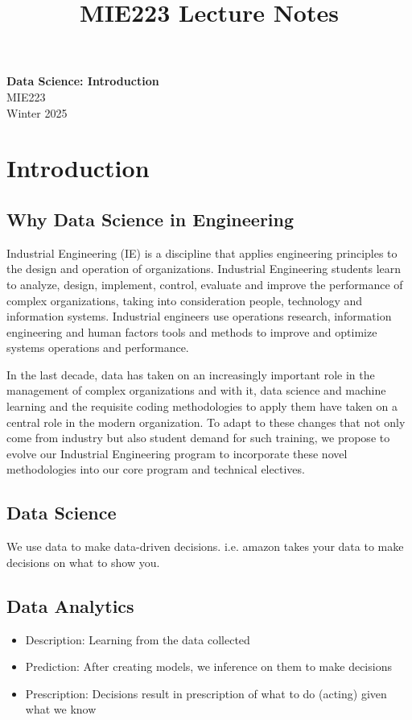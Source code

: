 \documentclass[11pt]{article}
\theoremstyle{definition}
\begin{document}
\setcounter{section}{0}
\title{MIE223 Lecture Notes}

\thispagestyle{empty}

\begin{center}
{\LARGE \bf Data Science: Introduction}\\
{\large MIE223}\\
Winter 2025
\end{center}
\section{Introduction}
\subsection{Why Data Science in Engineering}

Industrial Engineering (IE) is a discipline that applies engineering principles to the design and operation of
organizations. Industrial Engineering students learn to analyze, design, implement, control, evaluate and
improve the performance of complex organizations, taking into consideration people, technology and information
systems. Industrial engineers use operations research, information engineering and human factors tools and
methods to improve and optimize systems operations and performance.

In the last decade, data has taken on an increasingly important role in the management of complex
organizations and with it, data science and machine learning and the requisite coding methodologies to apply
them have taken on a central role in the modern organization. To adapt to these changes that not only come
from industry but also student demand for such training, we propose to evolve our Industrial Engineering program
to incorporate these novel methodologies into our core program and technical electives.

\subsection{Data Science}
We use data to make data-driven decisions. i.e. amazon takes your data to make decisions on what to show you.
\subsection{Data Analytics}
\begin{itemize}
  \item Description: Learning from the data collected
  \item Prediction: After creating models, we inference on them to make decisions
  \item Prescription: Decisions result in prescription of what to do (acting) given what we know
\end{itemize}
\end{document}
